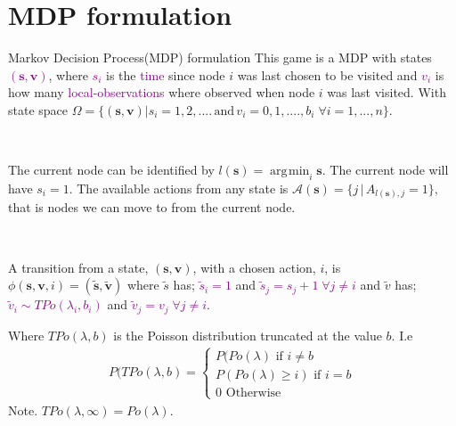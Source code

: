 \documentclass[10pt]{beamer}
\DeclareMathOperator*{\argmin}{\arg\!\min}
\begin{document}
\section{MDP formulation}
\begin{frame}{Markov Decision Process(MDP) formulation}
This game is a MDP with states \textcolor{purple}{$(\bm{s},\bm{v})$}, where \textcolor{purple}{$s_{i}$} is the \textcolor{purple}{time} since node $i$ was last chosen to be visited and \textcolor{purple}{$v_{i}$} is how many \textcolor{purple}{local-observations} where observed when node $i$ was last visited. With state space $\Omega=\{(\bm{s},\bm{v}) | s_{i}=1,2,.... \, \text{and}  \, v_{i}=0,1,....,b_{i} \; \forall i=1,...,n  \}$.

\
\pause

The current node can be identified by $l(\bm{s})=\argmin_{i} \bm{s}$. The current node will have $s_{i}=1$. The available actions from any state is $\mathcal{A}(\bm{s})=\{j \, | \, A_{l(\bm{s}),j}=1 \}$, that is nodes we can move to from the current node.

\
\pause
 
A transition from a state, $(\bm{s},\bm{v})$, with a chosen action, $i$, is $\phi(\bm{s},\bm{v},i)=(\widetilde{\bm{s}},\widetilde{\bm{v}})$ where $\widetilde{s}$ has; \textcolor{purple}{$\widetilde{s}_{i}=1$} and \textcolor{purple}{$\widetilde{s}_{j}=s_{j}+1 \; \forall j \neq i$} and $\widetilde{v}$ has; \textcolor{purple}{$\widetilde{v}_{i} \sim TPo(\lambda_{i},b_{i})$} and  \textcolor{purple}{$\widetilde{v}_{j}=v_{j} \; \forall j \neq i$}.

Where $TPo(\lambda,b)$ is the Poisson distribution truncated at the value $b$. I.e
\begin{align*}
P(TPo(\lambda,b)=\begin{cases}
P(Po(\lambda) \text{ if } i \neq b \\
P(Po(\lambda) \geq i) \text{ if } i=b \\
0 \text{ Otherwise}
\end{cases}
\end{align*}
Note. $TPo(\lambda,\infty)=Po(\lambda)$.

\end{frame}
\end{document}
